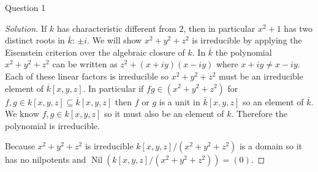 \documentclass{article}
\DeclareMathOperator{\Nil}{Nil}
\newenvironment{question}[1][]{\begin{paragraph}{Question #1}}{\end{paragraph}}
\newenvironment{solution}{\begin{proof}[Solution]\renewcommand\qedsymbol{}}{\end{proof}}
\theoremstyle{definition}
\begin{document}
\begin{question}[1]
\begin{enumerate}[(a)]
\begin{solution}
                  If \(k\) has characteristic different from \(2\), then in
                  particular \(x^{2}+1\) has two distinct roots in
                  \(\overline{k}\): \(\pm i\). We will show
                  \(x^{2}+y^{2}+z^{2}\) is irreducible by applying the
                  Eisenstein criterion over the algebraic closure of \(k\). In
                  \(\overline{k}\) the polynomial \(x^{2}+y^{2}+z^{2}\) can be
                  written as \(z^{2}+(x+iy)(x-iy)\) where \(x+iy\neq x-iy\).
                  Each of these linear factors is irreducible so
                  \(x^{2}+y^{2}+z^{2}\) must be an irreducible element of
                  \(\overline{k}[x,y,z]\). In particular if
                  \(fg\in(x^{2}+y^{2}+z^{2})\) for \(f,g\in
                  k[x,y,z]\subseteq\overline{k}[x,y,z]\) then \(f\) or \(g\) is
                  a unit in \(\overline{k}[x,y,z]\) so an element of
                  \(\overline{k}\). We know \(f,g\in k[x,y,z]\) so it must also
                  be an element of \(k\). Therefore the polynomial is
                  irreducible.

                  Because \(x^{2}+y^{2}+z^{2}\) is irreducible
                  \(k[x,y,z]/(x^{2}+y^{2}+z^{2})\) is a domain so it has no
                  nilpotents and \(\Nil(k[x,y,z]/(x^{2}+y^{2}+z^{2}))=(0)\).
              \end{solution}
    \end{enumerate}
\end{question}
\end{document}
